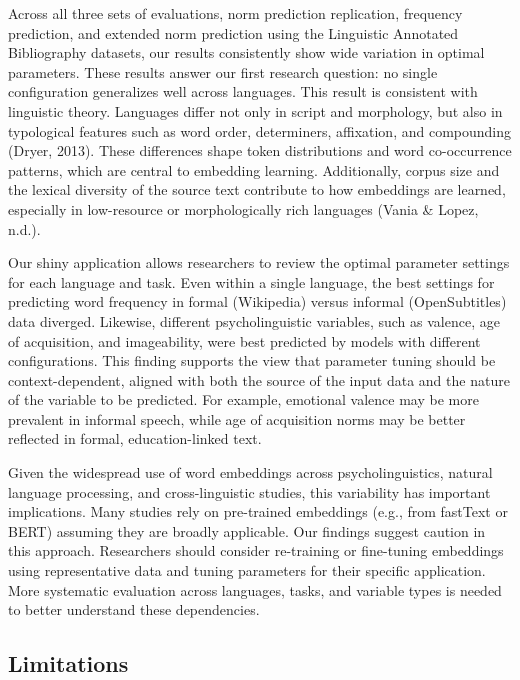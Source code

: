 \documentclass[
  english,
  man,floatsintext]{apa6}
\begin{document}
Across all three sets of evaluations, norm prediction replication, frequency prediction, and extended norm prediction using the Linguistic Annotated Bibliography datasets, our results consistently show wide variation in optimal parameters. These results answer our first research question: no single configuration generalizes well across languages. This result is consistent with linguistic theory. Languages differ not only in script and morphology, but also in typological features such as word order, determiners, affixation, and compounding (Dryer, 2013). These differences shape token distributions and word co-occurrence patterns, which are central to embedding learning. Additionally, corpus size and the lexical diversity of the source text contribute to how embeddings are learned, especially in low-resource or morphologically rich languages (Vania \& Lopez, n.d.).

Our shiny application allows researchers to review the optimal parameter settings for each language and task. Even within a single language, the best settings for predicting word frequency in formal (Wikipedia) versus informal (OpenSubtitles) data diverged. Likewise, different psycholinguistic variables, such as valence, age of acquisition, and imageability, were best predicted by models with different configurations. This finding supports the view that parameter tuning should be context-dependent, aligned with both the source of the input data and the nature of the variable to be predicted. For example, emotional valence may be more prevalent in informal speech, while age of acquisition norms may be better reflected in formal, education-linked text.

Given the widespread use of word embeddings across psycholinguistics, natural language processing, and cross-linguistic studies, this variability has important implications. Many studies rely on pre-trained embeddings (e.g., from fastText or BERT) assuming they are broadly applicable. Our findings suggest caution in this approach. Researchers should consider re-training or fine-tuning embeddings using representative data and tuning parameters for their specific application. More systematic evaluation across languages, tasks, and variable types is needed to better understand these dependencies.

\subsection{Limitations}\label{limitations}
\end{document}
